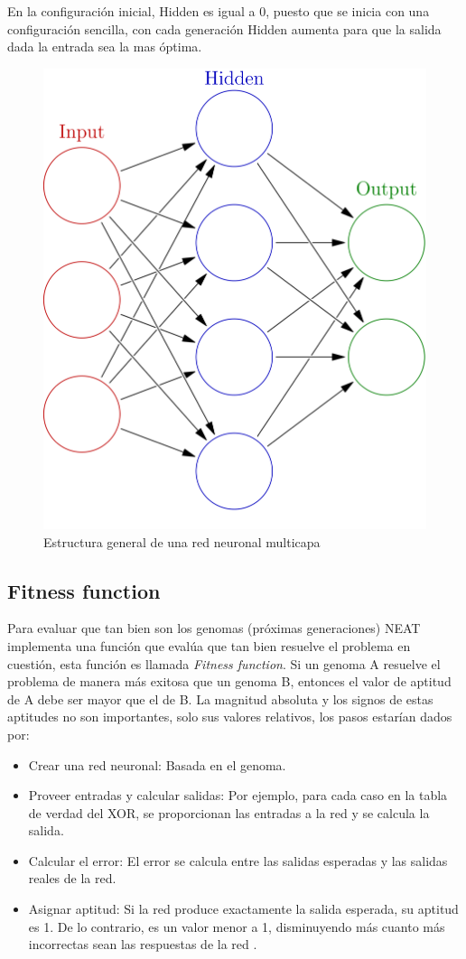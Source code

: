 \documentclass[conference]{IEEEtran}
\begin{document}
En la configuración inicial, Hidden es igual a 0, puesto que se inicia con una configuración sencilla, con cada generación Hidden aumenta para que la salida dada la entrada sea la mas óptima.

\begin{figure}
    \centering    \includegraphics[width=0.5\linewidth]{images/neural_network.png}
    \caption{Estructura general de una red neuronal multicapa \cite{red_neuronal}}
    \label{fig:Red-neuronal}
\end{figure}

\subsection{Fitness function}
Para evaluar que tan bien son los genomas (próximas generaciones) NEAT implementa una función que evalúa que tan bien resuelve el problema en cuestión, esta función es llamada \textit{Fitness function}. Si un genoma A resuelve el problema de manera más exitosa que un genoma B, entonces el valor de aptitud de A debe ser mayor que el de B. La magnitud absoluta y los signos de estas aptitudes no son importantes, solo sus valores relativos, los pasos estarían dados por:
\begin{itemize}
    \item Crear una red neuronal: Basada en el genoma.
    \item Proveer entradas y calcular salidas: Por ejemplo, para cada caso en la tabla de verdad del XOR, se proporcionan las entradas a la red y se calcula la salida.
    \item Calcular el error: El error se calcula entre las salidas esperadas y las salidas reales de la red.
    \item Asignar aptitud: Si la red produce exactamente la salida esperada, su aptitud es 1. De lo contrario, es un valor menor a 1, disminuyendo más cuanto más incorrectas sean las respuestas de la red \cite{neat_python}.
\end{itemize}
\end{document}
